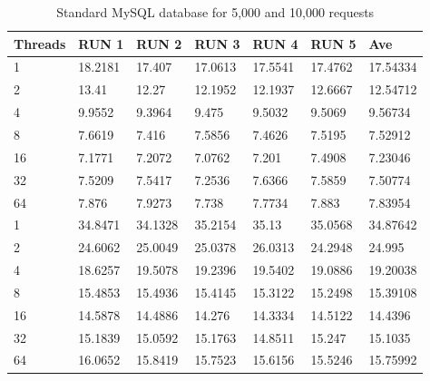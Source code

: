 \documentclass{article}
\begin{document}
\begin{table}[]
	\centering
	\caption{Standard MySQL database for 5,000 and 10,000 requests}
	\label{my-label}
	\begin{tabular}{@{}lllllll@{}}
		\toprule
		Threads & RUN 1   & RUN 2   & RUN 3   & RUN 4   & RUN 5   & Ave      \\ \midrule
		1       & 18.2181 & 17.407  & 17.0613 & 17.5541 & 17.4762 & 17.54334 \\
		2       & 13.41   & 12.27   & 12.1952 & 12.1937 & 12.6667 & 12.54712 \\
		4       & 9.9552  & 9.3964  & 9.475   & 9.5032  & 9.5069  & 9.56734  \\
		8       & 7.6619  & 7.416   & 7.5856  & 7.4626  & 7.5195  & 7.52912  \\
		16      & 7.1771  & 7.2072  & 7.0762  & 7.201   & 7.4908  & 7.23046  \\
		32      & 7.5209  & 7.5417  & 7.2536  & 7.6366  & 7.5859  & 7.50774  \\
		64      & 7.876   & 7.9273  & 7.738   & 7.7734  & 7.883   & 7.83954  \\\midrule
		1       & 34.8471 & 34.1328 & 35.2154 & 35.13   & 35.0568 & 34.87642 \\
		2       & 24.6062 & 25.0049 & 25.0378 & 26.0313 & 24.2948 & 24.995   \\
		4       & 18.6257 & 19.5078 & 19.2396 & 19.5402 & 19.0886 & 19.20038 \\
		8       & 15.4853 & 15.4936 & 15.4145 & 15.3122 & 15.2498 & 15.39108 \\
		16      & 14.5878 & 14.4886 & 14.276  & 14.3334 & 14.5122 & 14.4396  \\
		32      & 15.1839 & 15.0592 & 15.1763 & 14.8511 & 15.247  & 15.1035  \\
		64      & 16.0652 & 15.8419 & 15.7523 & 15.6156 & 15.5246 & 15.75992 \\ \bottomrule
	\end{tabular}
\end{table}
\end{document}
